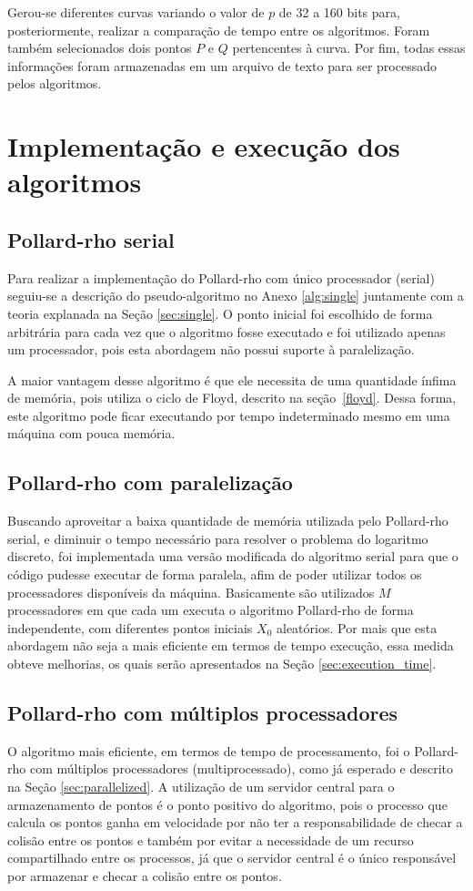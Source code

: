 Gerou-se diferentes curvas variando o valor de \(p\) de 32 a 160 bits para, posteriormente, realizar a comparação de tempo entre os algoritmos. Foram também selecionados dois pontos \(P\) e \(Q\) pertencentes à curva. Por fim, todas essas informações foram armazenadas em um arquivo de texto para ser processado pelos algoritmos.

\section{Implementação e execução dos algoritmos}

\subsection{Pollard-rho serial}
Para realizar a implementação do Pollard-rho com único processador (serial) seguiu-se a descrição do pseudo-algoritmo no Anexo \ref{alg:single} juntamente com a teoria explanada na Seção \ref{sec:single}. O ponto inicial foi escolhido de forma arbitrária para cada vez que o algoritmo fosse executado e foi utilizado apenas um processador, pois esta abordagem não possui suporte à paralelização.

A maior vantagem desse algoritmo é que ele necessita de uma quantidade ínfima de memória, pois utiliza o ciclo de Floyd, descrito na seção~\ref{floyd}. Dessa forma, este algoritmo pode ficar executando por tempo indeterminado mesmo em uma máquina com pouca memória.

\subsection{Pollard-rho com paralelização}
Buscando aproveitar a baixa quantidade de memória utilizada pelo Pollard-rho serial, e diminuir o tempo necessário para resolver o problema do logaritmo discreto, foi implementada uma versão modificada do algoritmo serial para que o código pudesse executar de forma paralela, afim de poder utilizar todos os processadores disponíveis da máquina. Basicamente são utilizados \(M\) processadores em que cada um executa o algoritmo Pollard-rho de forma independente, com diferentes pontos iniciais \(X_0\) aleatórios. Por mais que esta abordagem não seja a mais eficiente em termos de tempo execução, essa medida obteve melhorias, os quais serão apresentados na Seção \ref{sec:execution_time}.

\subsection{Pollard-rho com múltiplos processadores}
O algoritmo mais eficiente, em termos de tempo de processamento, foi o Pollard-rho com múltiplos processadores (multiprocessado), como já esperado e descrito na Seção \ref{sec:parallelized}. A utilização de um servidor central para o armazenamento de pontos é o ponto positivo do algoritmo, pois o processo que calcula os pontos ganha em velocidade por não ter a responsabilidade de checar a colisão entre os pontos e também por evitar a necessidade de um recurso compartilhado entre os processos, já que o servidor central é o único responsável por armazenar e checar a colisão entre os pontos.

